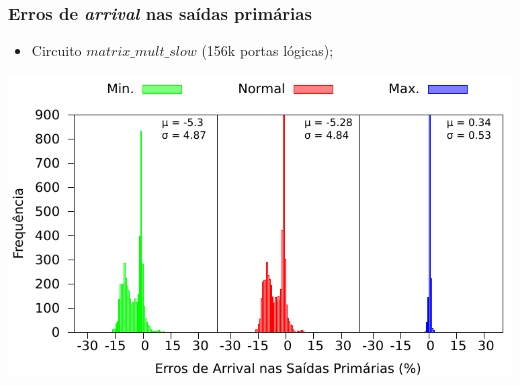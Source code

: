 \documentclass[10pt,a4paper]{beamer}
\begin{document}
%		
		\begin{frame}[t]
			\frametitle{Erros de \textit{arrival} nas saídas primárias}
			\begin{itemize}
				\item Circuito $matrix\_mult\_slow$ (156k portas lógicas);
			\end{itemize}
			\begin{center}
				\includegraphics[width=0.9\linewidth]{img/arrival_error/matrix_mult_puri.pdf}\\
			\end{center}
		\end{frame}
		
\end{document}
